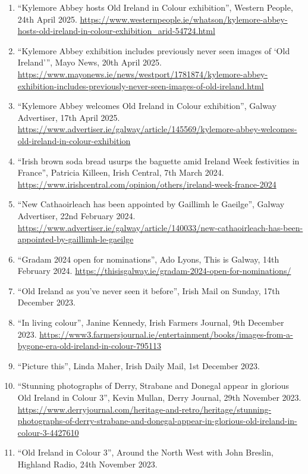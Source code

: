 \documentclass[10pt,a4paper]{res} %
\begin{document}
\begin{resume}
{\begin{enumerate} \itemsep -2pt
\item ``Kylemore Abbey hosts Old Ireland in Colour exhibition'', Western People, 24th April 2025. \url{https://www.westernpeople.ie/whatson/kylemore-abbey-hosts-old-ireland-in-colour-exhibition_arid-54724.html}
\item ``Kylemore Abbey exhibition includes previously never seen images of {`Old Ireland'}'', Mayo News, 20th April 2025. \url{https://www.mayonews.ie/news/westport/1781874/kylemore-abbey-exhibition-includes-previously-never-seen-images-of-old-ireland.html}
\item ``Kylemore Abbey welcomes Old Ireland in Colour exhibition'', Galway Advertiser, 17th April 2025. \url{https://www.advertiser.ie/galway/article/145569/kylemore-abbey-welcomes-old-ireland-in-colour-exhibition}
\item ``Irish brown soda bread usurps the baguette amid Ireland Week festivities in France'', Patricia Killeen, Irish Central, 7th March 2024. \url{https://www.irishcentral.com/opinion/others/ireland-week-france-2024}
\item ``New Cathaoirleach has been appointed by Gaillimh le Gaeilge'', Galway Advertiser, 22nd February 2024. \url{https://www.advertiser.ie/galway/article/140033/new-cathaoirleach-has-been-appointed-by-gaillimh-le-gaeilge}
\item ``Gradam 2024 open for nominations'', Ado Lyons, This is Galway, 14th February 2024. \url{https://thisisgalway.ie/gradam-2024-open-for-nominations/}
\item ``Old Ireland as you've never seen it before'', Irish Mail on Sunday, 17th December 2023.
\item ``In living colour'', Janine Kennedy, Irish Farmers Journal, 9th December 2023. \url{https://www3.farmersjournal.ie/entertainment/books/images-from-a-bygone-era-old-ireland-in-colour-795113}
\item ``Picture this'', Linda Maher, Irish Daily Mail, 1st December 2023.
\item ``Stunning photographs of Derry, Strabane and Donegal appear in glorious Old Ireland in Colour 3'', Kevin Mullan, Derry Journal, 29th November 2023. \url{https://www.derryjournal.com/heritage-and-retro/heritage/stunning-photographs-of-derry-strabane-and-donegal-appear-in-glorious-old-ireland-in-colour-3-4427610}
\item ``Old Ireland in Colour 3'', Around the North West with John Breslin, Highland Radio, 24th November 2023.

\end{enumerate}}
\end{resume}
\end{document}
